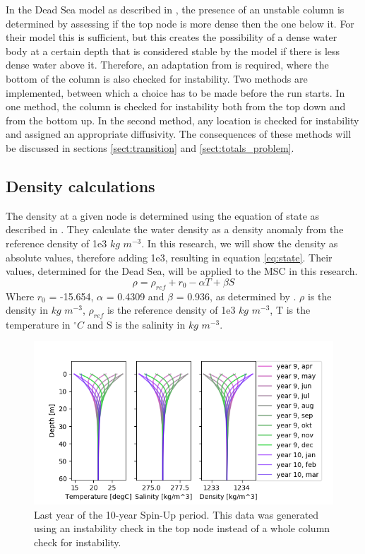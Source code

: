 \documentclass[twocolumn]{article}
\begin{document}
In the Dead Sea model as described in \cite{Heiden2017Application}, the presence of an unstable column is determined by assessing if the top node is more dense then the one below it. For their model this is sufficient, but this creates the possibility of a dense water body at a certain depth that is considered stable by the model if there is less dense water above it. Therefore, an adaptation from \cite{Heiden2017Application} is required, where the bottom of the column is also checked for instability. Two methods are implemented, between which a choice has to be made before the run starts. In one method, the column is checked for instability both from the top down and from the bottom up. In the second method, any location is checked for instability and assigned an appropriate diffusivity. The consequences of these methods will be discussed in sections \ref{sect:transition} and \ref{sect:totals_problem}.

\subsection{Density calculations}
The density at a given node is determined using the equation of state as described in \cite{ivanov2002model}. They calculate the water density as a density anomaly from the reference density of 1e3 $kg$ $m^{-3}$. In this research, we will show the density as absolute values, therefore adding 1e3, resulting in equation \ref{eq:state}. Their values, determined for the Dead Sea, will be applied to the MSC in this research.
\begin{equation}
    \rho = \rho_{ref} + r_0 - \alpha T + \beta S
\label{eq:state}
\end{equation}
Where $r_0$ = -15.654, $\alpha$ = 0.4309 and $\beta$ = 0.936, as determined by \cite{ivanov2002model}. $\rho$ is the density in $kg$ $m^{-3}$, $\rho_{ref}$ is the reference density of 1e3 $kg$ $m^{-3}$, T is the temperature in $^{\circ} C$ and S is the salinity in $kg$ $m^{-3}$. 

\begin{figure}
\centering
\hspace*{-1.2cm}
\includegraphics[width=1.05\textwidth,keepaspectratio]{SpinUp_year_9.png}
\caption{Last year of the 10-year Spin-Up period. This data was generated using an instability check in the top node instead of a whole column check for instability.}
\label{fig:SpinUp}
\end{figure}
\end{document}
